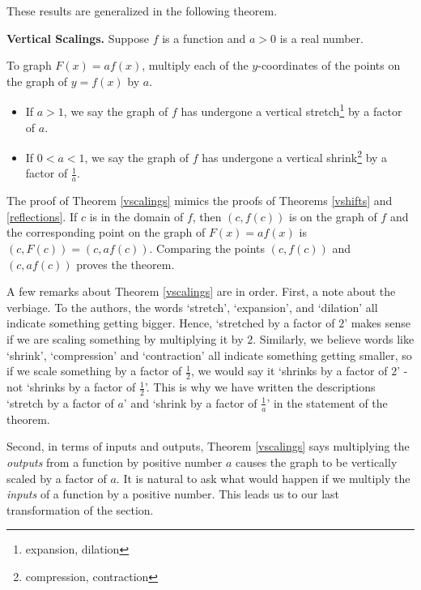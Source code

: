 \documentclass{ximera}
\begin{document}
These results are generalized in the following theorem.

\begin{theorem} \label{vscalings}\textbf{Vertical Scalings.} Suppose $f$ is a function and $a>0$ is a real number. 

To graph $F(x) = af(x)$, multiply each of the $y$-coordinates of the points on the graph of $y=f(x)$ by $a$. 

\begin{itemize}

\item If $a > 1$, we say the graph of $f$ has undergone a vertical stretch\footnote{expansion, dilation} by a factor of $a$. 

\item If $0 < a < 1$, we say the graph of $f$ has undergone a vertical shrink\footnote{ compression, contraction} by a factor of $\frac{1}{a}$.

\end{itemize}

\end{theorem}


\smallskip

The proof of Theorem \ref{vscalings} mimics the proofs of Theorems \ref{vshifts} and \ref{reflections}.  If $c$ is in the domain of $f$, then $(c, f(c))$ is on the graph of $f$ and the corresponding point on the graph of $F(x)=af(x)$ is $(c, F(c)) = (c, a f(c))$.  Comparing the points $(c, f(c))$ and $(c, a f(c))$ proves the theorem.  

\smallskip

A few remarks about Theorem \ref{vscalings} are in order.  First, a note about the verbiage.  To the authors, the words `stretch', `expansion', and `dilation' all indicate something getting bigger.  Hence, `stretched by a factor of $2$' makes sense if we are scaling something by multiplying it by $2$. Similarly, we believe words like `shrink', `compression' and `contraction' all indicate something getting smaller, so if we scale something by a factor of $\frac{1}{2}$, we would say it `shrinks by a factor of $2$' - not `shrinks by a factor of $\frac{1}{2}$'.  This is why we have written the descriptions `stretch by a factor of $a$' and `shrink by a factor of $\frac{1}{a}$' in the statement of the theorem.  

\smallskip

Second, in terms of inputs and outputs, Theorem \ref{vscalings} says multiplying the \textit{outputs} from a function by positive number $a$ causes the graph to be vertically scaled by a factor of $a$.  It is natural to ask what would happen if we multiply the \textit{inputs} of a function by a positive number.  This leads us to our last transformation of the section.
\end{document}
